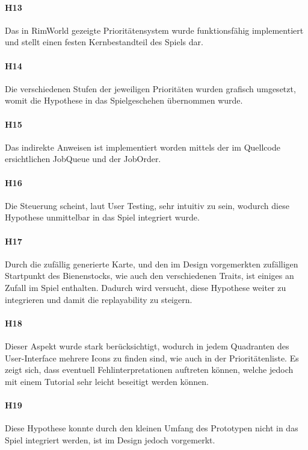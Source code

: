 \paragraph*{H13}
Das in RimWorld gezeigte Prioritätensystem wurde funktionsfähig implementiert und stellt einen festen Kernbestandteil des Spiels dar.

\paragraph*{H14}
Die verschiedenen Stufen der jeweiligen Prioritäten wurden grafisch umgesetzt, womit die Hypothese in das Spielgeschehen übernommen wurde.

\paragraph*{H15}
Das indirekte Anweisen ist implementiert worden mittels der im Quellcode ersichtlichen JobQueue und der JobOrder. 

\paragraph*{H16}
Die Steuerung scheint, laut User Testing, sehr intuitiv zu sein, wodurch diese Hypothese unmittelbar in das Spiel integriert wurde.

\paragraph*{H17}
Durch die zufällig generierte Karte, und den im Design vorgemerkten zufälligen Startpunkt des Bienenstocks, wie auch den verschiedenen Traits, ist einiges an Zufall im Spiel enthalten. Dadurch wird versucht, diese Hypothese weiter zu integrieren und damit die replayability zu steigern.

\paragraph*{H18}
Dieser Aspekt wurde stark berücksichtigt, wodurch in jedem Quadranten des User-Interface mehrere Icons zu finden sind, wie auch in der Prioritätenliste. Es zeigt sich, dass eventuell Fehlinterpretationen auftreten können, welche jedoch mit einem Tutorial sehr leicht beseitigt werden können.

\paragraph*{H19}
Diese Hypothese konnte durch den kleinen Umfang des Prototypen nicht in das Spiel integriert werden, ist im Design jedoch vorgemerkt.

